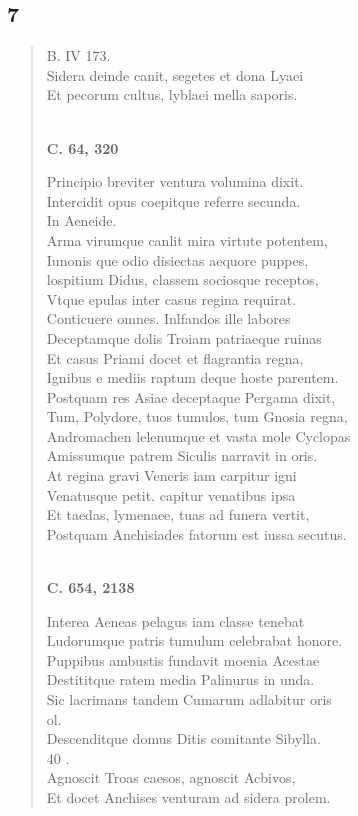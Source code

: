 \documentclass[11pt, a4paper]{report}
\begin{document}
            \subsection*{7}
      \begin{verse}
      B. IV 173. \\ Sidera deinde canit, segetes et dona Lyaei \\ Et pecorum cultus, lyblaei mella saporis. \\ 
        ﻿\pagebreak 
    \begin{center} \textbf{C. 64, 320} \end{center} \marginpar{[126]} Principio breviter ventura volumina dixit. \\ Intercidit opus coepitque referre secunda. \\ In Aeneide. \\ Arma virumque canlit mira virtute potentem, \\ Iunonis \lbrack que \rbrack  odio disiectas aequore puppes, \\ lospitium Didus, classem sociosque receptos, \\ Vtque epulas inter casus regina requirat. \\ Conticuere omnes. Inlfandos ille labores \\ Deceptamque dolis Troiam patriaeque ruinas \\ Et casus Priami docet et flagrantia regna, \\ Ignibus e mediis raptum deque hoste parentem. \\ Postquam res Asiae \rbrack  deceptaque Pergama dixit, \\ Tum, Polydore, tuos tumulos, tum Gnosia regna, \\ Andromachen lelenumque et vasta mole Cyclopas \\ Amissumque patrem Siculis narravit in oris. \\ At regina gravi Veneris iam carpitur igni \rbrack  \\ Venatusque petit. capitur venatibus ipsa \\ Et taedas, lymenaee, tuas ad funera vertit, \\ Postquam Anchisiades fatorum est iussa secutus. \\ 
        ﻿\pagebreak 
    \begin{center} \textbf{C. 654, 2138} \end{center} \marginpar{[127]} Interea Aeneas pelagus iam classe tenebat \rbrack  \\ Ludorumque patris tumulum celebrabat honore. \\ Puppibus ambustis fundavit moenia Acestae \\ Destititque ratem media Palinurus in unda. \\ Sic lacrimans tandem Cumarum adlabitur oris \rbrack  \\ ol. \\ Descenditque domus Ditis comitante Sibylla. \\ 40 . \\ Agnoscit Troas caesos, agnoscit Acbivos, \\ Et docet Anchises venturam ad sidera prolem. \\ 
      \end{verse}
  
\end{document}
